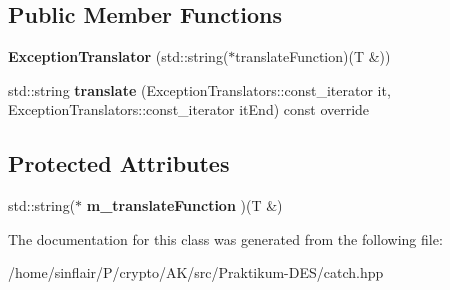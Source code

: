 \subsection*{Public Member Functions}
\begin{DoxyCompactItemize}
\item 
\mbox{\label{classCatch_1_1ExceptionTranslatorRegistrar_1_1ExceptionTranslator_a2de4e9bcaad47996159763e69f614d7a}} 
{\bfseries Exception\+Translator} (std\+::string($\ast$translate\+Function)(T \&))
\item 
\mbox{\label{classCatch_1_1ExceptionTranslatorRegistrar_1_1ExceptionTranslator_a29e85940ee9ce719f26e43550cb4ed48}} 
std\+::string {\bfseries translate} (Exception\+Translators\+::const\+\_\+iterator it, Exception\+Translators\+::const\+\_\+iterator it\+End) const override
\end{DoxyCompactItemize}
\subsection*{Protected Attributes}
\begin{DoxyCompactItemize}
\item 
\mbox{\label{classCatch_1_1ExceptionTranslatorRegistrar_1_1ExceptionTranslator_a488013ff0869785c9d041443fbf9a757}} 
std\+::string($\ast$ {\bfseries m\+\_\+translate\+Function} )(T \&)
\end{DoxyCompactItemize}


The documentation for this class was generated from the following file\+:\begin{DoxyCompactItemize}
\item 
/home/sinflair/\+P/crypto/\+A\+K/src/\+Praktikum-\/\+D\+E\+S/catch.\+hpp\end{DoxyCompactItemize}
